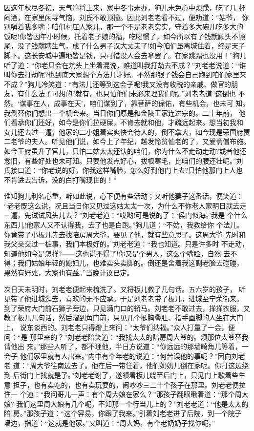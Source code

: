 因这年秋尽冬初，天气冷将上来，家中冬事未办，狗儿未免心中烦躁，吃了几
杯闷酒，在家里闲寻气恼，刘氏不敢顶撞。因此刘老老看不过，便劝道：“姑爷，
你别嗔着我多嘴：咱们村庄人家儿，那一个不是老老实实，守着多大碗儿吃多大的
饭呢!你皆因年小时候，托着老子娘的福，吃喝惯了，如今所以有了钱就顾头不顾
尾，没了钱就瞎生气，成了什么男子汉大丈夫了!如今咱们虽离城住着，终是天子
脚下。这长安城中遍地皆是钱，只可惜没人会去拿罢了。在家跳蹋也没用！”狗儿
听了道：“你老只会在炕头上坐着混说，难道叫我打劫去不成？”刘老老说道：“谁
叫你去打劫呢?也到底大家想个方法儿才好。不然那银子钱会自己跑到咱们家里来
不成？”狗儿冷笑道：“有法儿还等到这会子呢!我又没有收税的亲戚、做官的朋
友，有什么法子可想的?就有，也只怕他们未必来理我们呢。”刘老老道“这倒也
不然。‘谋事在人，成事在天’，咱们谋到了，靠菩萨的保佑，有些机会，也未可
知。我倒替你们想出一个机会来。当日你们原是和金陵王家连过宗的。二十年前，
他们看承你们还好，如今是你们拉硬屎，不肯去就和他，才疏远起来。想当初我和
女儿还去过一遭，他家的二小姐着实爽快会待人的，倒不拿大，如今现是荣国府贾
二老爷的夫人。听见他们说，如今上了年纪，越发怜贫恤老的了，又爱斋僧布施。
如今王府虽升了官儿，只怕二姑太太还认的咱们，你为什么不走动走动?或者他还
念旧，有些好处也未可知。只要他发点好心，拔根寒毛，比咱们的腰还壮呢。”刘
氏接口道：“你老说的好，你我这样嘴脸，怎么好到他门上去?只怕他那门上人也
不肯进去告诉，没的白打嘴现世的！”

谁知狗儿利名心重，听如此说，心下便有些活动；又听他妻子这番话，便笑道：
“老老既这么说，况且当日你又见过这姑太太一次，为什么不你老人家明日就去走
一遭，先试试风头儿去？”刘老老道：“哎哟!可是说的了：‘侯门似海。’我是
个什么东西儿!他家人又不认得我，去了也是白跑。”狗儿道：“不妨，我教给你
个法儿。你竟带了小板儿先去找陪房周大爷，要见了他，就有些意思了。这周大爷
先时和我父亲交过一桩事，我们本极好的。”刘老老道：“我也知道。只是许多时
不走动，知道他如今是怎样?——这也说不得了!你又是个男人，这么个嘴脸，自然
去不得；我们姑娘年轻的媳妇儿，也难卖头卖脚的。倒还是舍着我这副老脸去碰碰，
果然有好处，大家也有益。”当晚计议已定。

次日天未明时，刘老老便起来梳洗了。又将板儿教了几句话。五六岁的孩子，
听见带了他进城逛去，喜欢的无不应承。于是刘老老带了板儿，进城至宁荣街来。
到了荣府大门前石狮子旁边，只见满门口的轿马。刘老老不敢过去，掸掸衣服，又
教了板儿几句话，然后溜到角门前，只见几个挺胸叠肚、指手画脚的人坐在大门上，
说东谈西的。刘老老只得蹭上来问：“太爷们纳福。”众人打量了一会，便问：“是
那里来的？”刘老老陪笑道：“我找太太的陪房周大爷的。烦那位太爷替我请他出
来。”那些人听了，都不理他，半日方说道：“你远远的那墙畸角儿等着，一会子
他们家里就有人出来。”内中有个年老的说道：“何苦误他的事呢？”因向刘老老
道：“周大爷往南边去了。他在后一带住着，他们奶奶儿倒在家呢。你打这边绕到
后街门上找就是了。”刘老老谢了，遂领着板儿绕至后门上，只见门上歇着些生意
担子，也有卖吃的，也有卖玩耍的，闹吵吵三二十个孩子在那里。刘老老便拉住一
个道：“我问哥儿一声：有个周大娘在家么？”那孩子翻眼瞅着道：“那个周大娘?
我们这里周大娘有几个呢，不知那一个行当儿上的？”刘老老道：“他是太太的陪
房。”那孩子道：“这个容易，你跟了我来。”引着刘老老进了后院，到一个院子
墙边，指道：“这就是他家。”又叫道：“周大妈，有个老奶奶子找你呢。”

